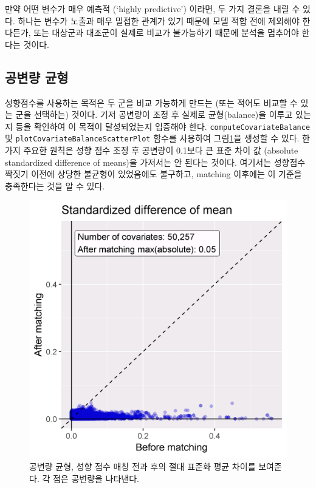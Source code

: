 \documentclass[11pt]{book}
\theoremstyle{definition}
\theoremstyle{definition}
\theoremstyle{definition}
\theoremstyle{remark}
\let\BeginKnitrBlock\begin \let\EndKnitrBlock\end
\begin{document}
\BeginKnitrBlock{rmdimportant}
만약 어떤 변수가 매우 예측적 (`highly predictive') 이라면, 두 가지
결론을 내릴 수 있다. 하나는 변수가 노출과 매우 밀접한 관계가 있기 때문에
모델 적합 전에 제외해야 한다든가, 또는 대상군과 대조군이 실제로 비교가
불가능하기 때문에 분석을 멈추어야 한다는 것이다.
\EndKnitrBlock{rmdimportant}

\subsection{공변량 균형}\label{-}

성향점수를 사용하는 목적은 두 군을 비교 가능하게 만드는 (또는 적어도
비교할 수 있는 군을 선택하는) 것이다. 기저 공변량이 조정 후 실제로
균형(balance)을 이루고 있는지 등을 확인하여 이 목적이 달성되었는지
입증해야 한다. \texttt{computeCovariateBalance} 및
\texttt{plotCovariateBalanceScatterPlot} 함수를 사용하여
그림\ref{fig:balance}을 생성할 수 있다. 한 가지 주요한 원칙은 성향 점수
조정 후 공변량이 0.1보다 큰 표준 차이 값 (absolute standardized
difference of means)을 가져서는 안 된다는 것이다. 여기서는 성향점수
짝짓기 이전에 상당한 불균형이 있었음에도 불구하고, matching 이후에는 이
기준을 충족한다는 것을 알 수 있다.

\begin{figure}

{\centering \includegraphics[width=0.7\linewidth]{images/PopulationLevelEstimation/balance} 

}

\caption{공변량 균형, 성향 점수 매칭 전과 후의 절대 표준화 평균 차이를 보여준다. 각 점은 공변량을 나타낸다.}\label{fig:balance}
\end{figure}
\end{document}
